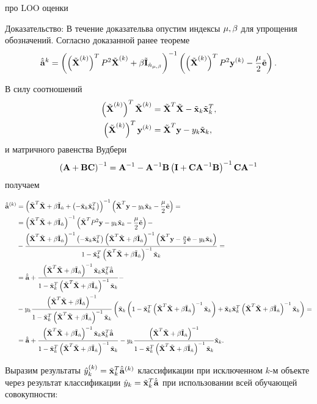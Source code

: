 \begin{theorem}
про LOO оценки
\end{theorem}

Доказательство:
В течение доказательва опустим индексы ${\mu,\beta}$ для упрощения обозначений.
Согласно доказанной ранее теореме
\def\this{^{(k)}}
\begin{equation}
	\besta^{k}
		= \cbr{\cbr{\tilde{\mb X}\this}^T P^2\tilde{\mb X}\this + \beta \tilde{\mb I}_{\hat n_\lams}}^{-1}\cbr{\cbr{\tilde{\mb X}\this}^T P^2 \mb y^{(k)} -\frac\mu2\tilde{\mb e}}.
\end{equation}

В силу соотношений
\begin{align}
	\cbr{\tilde {\mb X}\this}^T \tilde{\mb X}\this
		&= \tilde{\mb X}^T \tilde{\mb X} - \tilde{\mb x}_k \tilde{\mb x}_k^T, \\
	\cbr{\tilde {\mb X}\this}^T \mb y^{(k)}
		&= \tilde{\mb X}^T \mb y - y_k \tilde{\mb x}_k,
\end{align}
и матричного равенства Вудбери
\begin{equation}
	\left(\boldsymbol{\mathbf{A}}+\boldsymbol{\mathbf{B}} \boldsymbol{\mathbf{C}}\right)^{-1} = \boldsymbol{\mathbf{A}}^{-1} - \boldsymbol{\mathbf{A}}^{-1} \boldsymbol{\mathbf{B}}\left(\boldsymbol{\mathbf{I}} + \boldsymbol{\mathbf{C}} \boldsymbol{\mathbf{A}}^{-1} \boldsymbol{\mathbf{B}}\right)^{-1} \boldsymbol{\mathbf{C}} \boldsymbol{\mathbf{A}}^{-1}
\end{equation}
получаем

\def\A{\tilde{\mb X}^T\tilde{\mb X} + \beta \tilde{\mb I}_{\hat n}}
\def\xxt{\tilde{\mb x}_k \tilde{\mb x}_k^T}
\def\denominator{1 - \tilde{\mb x}_k^T\inv{\A}\tilde{\mb x}_k}
\begin{align}
	\besta\this
		&= \inv{\A + \cbr{- \xxt}}
		\cbr{\tilde{\mb X}^T \mb y - y_k\tilde{\mb x}_k -\frac\mu2\tilde{\mb e}} = \\
		&= \inv{\A} \cbr{\tilde{\mb X}^T P^2\mb y - y_k\tilde{\mb x}_k -\frac\mu2\tilde{\mb e}} - \\
		&- \frac{\inv{\A}\cbr{-\xxt}\inv{\A}\cbr{\tilde{\mb X}^T \mb y  -\frac\mu2\tilde{\mb e} - y_k\tilde{\mb x}_k}}{\denominator} = \\
		&= \besta + \frac{\inv{\A}\xxt\besta}{\denominator} - \\
		&- y_k\frac{\inv{\A}}{\denominator}\cbr{\tilde{\mb x}_k\cbr{\denominator} + \xxt\inv{\A}\tilde{\mb x}_k} = \\
		&= \besta + \frac{\inv{\A}\xxt\besta}{\denominator} - y_k\frac{\inv{\A}}{\denominator}\tilde{\mb x}_k.
\end{align}

Выразим результаты $\hat y\this_k = \tilde{\mb x}^T_k\besta\this$ классификации при исключенном $k$-м объекте через результат классификации $\hat y_k = \tilde{\boldsymbol{\mathbf{x}}}^T_k\hat{\tilde{\mathbf a}}$ при использовании всей обучающей совокупности:

